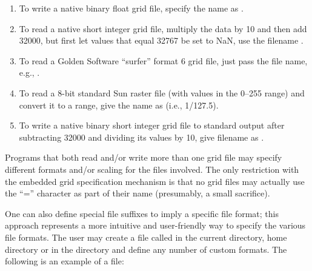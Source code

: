 \begin{enumerate}
\item To write a native binary float grid file, specify the name as .

\item To read a native short integer grid file, multiply the data by 10 and then
add 32000, but first let values that equal 32767 be set to NaN,
use the filename . 

\item To read a Golden Software ``surfer'' format 6 grid file, just pass the file name,
e.g., . 

\item To read a 8-bit standard Sun raster file (with values in the 0--255 range)
and convert it to a  range, give the name as
 (i.e., 1/127.5).

\item To write a native binary short integer grid file to standard output after subtracting
32000 and dividing its values by 10, give filename as . 

\end{enumerate} 

Programs that both read and/or write more than one grid file may
specify different formats and/or scaling for the files involved.
The only restriction with the embedded grid specification mechanism
is that no grid files may actually use the ``=''
character as part of their name (presumably, a small sacrifice). 


One can also define special file suffixes to imply a specific file
format; this approach represents a more intuitive and user-friendly
way to specify the various file formats.  The user may create a file
called  in the current directory, home directory
or in the directory  and define any
number of custom formats.  The following is an example of a
 file:

\vspace{\baselineskip} 

